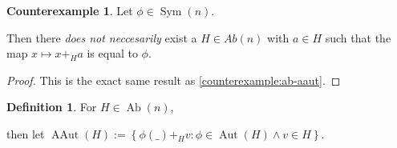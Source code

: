 \documentclass[a4paper, 12pt, english]{article}
\theoremstyle{plain}
\theoremstyle{definition}
\newtheorem{definition}[theorem]{Definition}
\newtheorem{counterexample}[theorem]{Counterexample}
\newcommand{\set}[1]{ \left\{ #1 \right\} } %
\DeclareMathOperator{\Ab}{Ab}
\DeclareMathOperator{\Aut}{Aut}
\DeclareMathOperator{\AAut}{AAut}
\DeclareMathOperator{\Sym}{Sym}
\begin{document}
\begin{counterexample}
    Let \( \phi \in \Sym(n) \).

    Then there \emph{does not neccesarily} exist a \( H \in Ab(n) \) with \( a \in H \) such that the map  \( x \mapsto  x +_H a \) is equal to \( \phi \).
\end{counterexample}
\begin{proof}
    This is the exact same result as \autoref{counterexample:ab-aaut}.
\end{proof}

\begin{definition}
    For \( H \in \Ab(n) \),

    then let \( \AAut(H) := \set{\phi(\_) +_H v : \phi \in \Aut(H) \land v \in H} \).
\end{definition}
\end{document}
